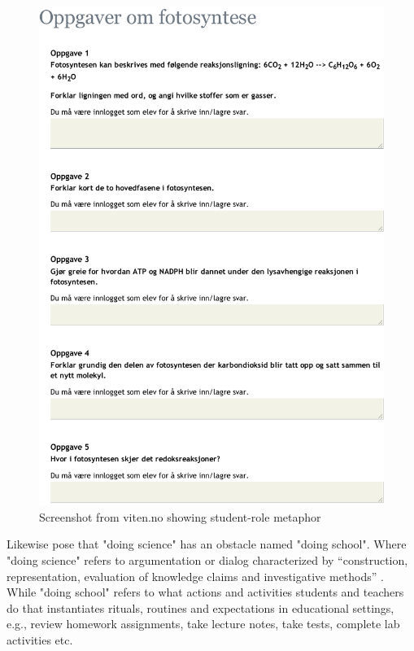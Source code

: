 \begin{figure}
\centering
\includegraphics[width=1\textwidth]{img/theoretical/viten.pdf}
\caption{Screenshot from viten.no showing student-role metaphor}
\label{fig:scrshotviten}
\end{figure}

Likewise \citet{jimenez2000doing} pose that "doing science" has an obstacle named "doing school". Where "doing science" refers to argumentation or dialog characterized by “construction, representation, evaluation of knowledge claims and investigative methods” \citep{jimenez2000doing}. While "doing school" refers to what actions and activities students and teachers do that instantiates rituals, routines and expectations in educational settings, e.g., review homework assignments, take lecture notes, take tests, complete lab activities etc. 


